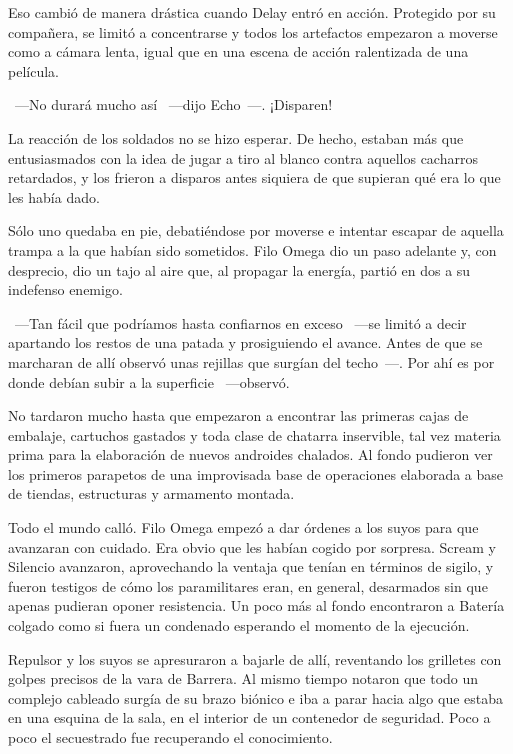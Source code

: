 Eso cambió de manera drástica cuando Delay entró en acción. Protegido por su compañera, se limitó a concentrarse y todos los artefactos empezaron a moverse como a cámara lenta, igual que en una escena de acción ralentizada de una película.

~---No durará mucho así ~---dijo Echo~---. ¡Disparen!

La reacción de los soldados no se hizo esperar. De hecho, estaban más que entusiasmados con la idea de jugar a tiro al blanco contra aquellos cacharros retardados, y los frieron a disparos antes siquiera de que supieran qué era lo que les había dado.

Sólo uno quedaba en pie, debatiéndose por moverse e intentar escapar de aquella trampa a la que habían sido sometidos. Filo Omega dio un paso adelante y, con desprecio, dio un tajo al aire que, al propagar la energía, partió en dos a su indefenso enemigo.

~---Tan fácil que podríamos hasta confiarnos en exceso ~---se limitó a decir apartando los restos de una patada y prosiguiendo el avance. Antes de que se marcharan de allí observó unas rejillas que surgían del techo~---. Por ahí es por donde debían subir a la superficie ~---observó.

No tardaron mucho hasta que empezaron a encontrar las primeras cajas de embalaje, cartuchos gastados y toda clase de chatarra inservible, tal vez materia prima para la elaboración de nuevos androides chalados. Al fondo pudieron ver los primeros parapetos de una improvisada base de operaciones elaborada a base de tiendas, estructuras y armamento montada.

Todo el mundo calló. Filo Omega empezó a dar órdenes a los suyos para que avanzaran con cuidado. Era obvio que les habían cogido por sorpresa. Scream y Silencio avanzaron, aprovechando la ventaja que tenían en términos de sigilo, y fueron testigos de cómo los paramilitares eran, en general, desarmados sin que apenas pudieran oponer resistencia. Un poco más al fondo encontraron a Batería colgado como si fuera un condenado esperando el momento de la ejecución.

Repulsor y los suyos se apresuraron a bajarle de allí, reventando los grilletes con golpes precisos de la vara de Barrera. Al mismo tiempo notaron que todo un complejo cableado surgía de su brazo biónico e iba a parar hacia algo que estaba en una esquina de la sala, en el interior de un contenedor de seguridad. Poco a poco el secuestrado fue recuperando el conocimiento.

